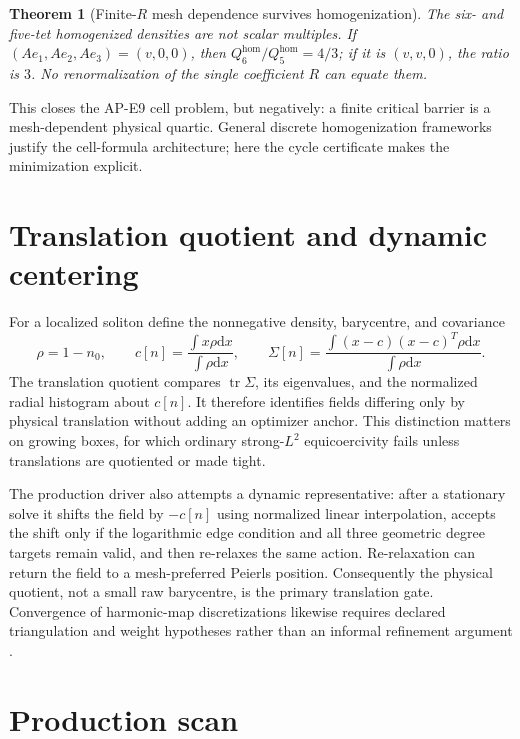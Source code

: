 \documentclass[11pt]{article}
\numberwithin{equation}{section}
\newtheorem{theorem}{Theorem}[section]
\theoremstyle{definition}
\theoremstyle{remark}
\newcommand{\dd}{\mathrm d}
\begin{document}
\begin{theorem}[Finite-$R$ mesh dependence survives homogenization]
The six- and five-tet homogenized densities are not scalar multiples.  If
$(Ae_1,Ae_2,Ae_3)=(v,0,0)$, then
$Q_6^{\mathrm{hom}}/Q_5^{\mathrm{hom}}=4/3$; if it is $(v,v,0)$, the ratio is
$3$.  No renormalization of the single coefficient $R$ can equate them.
\end{theorem}

This closes the AP-E9 cell problem, but negatively: a finite critical barrier
is a mesh-dependent physical quartic.  General discrete homogenization
frameworks \cite{AlicandroBraidesCicaleseSolci2023} justify the cell-formula
architecture; here the cycle certificate makes the minimization explicit.

\section{Translation quotient and dynamic centering}

For a localized soliton define the nonnegative density, barycentre, and
covariance
\begin{equation}
 \rho=1-n_0,\qquad
 c[n]=\frac{\int x\rho\dd x}{\int\rho\dd x},\qquad
 \Sigma[n]=\frac{\int(x-c)(x-c)^T\rho\dd x}{\int\rho\dd x}.
 \label{eq:quotient}
\end{equation}
The translation quotient compares $\operatorname{tr}\Sigma$, its eigenvalues,
and the normalized radial histogram about $c[n]$.  It therefore identifies
fields differing only by physical translation without adding an optimizer
anchor.  This distinction matters on growing boxes, for which ordinary
strong-$L^2$ equicoercivity fails unless translations are quotiented or made
tight.

The production driver also attempts a dynamic representative: after a
stationary solve it shifts the field by $-c[n]$ using normalized linear
interpolation, accepts the shift only if the logarithmic edge condition and
all three geometric degree targets remain valid, and then re-relaxes the
same action.  Re-relaxation can return the field to a mesh-preferred Peierls
position.  Consequently the physical quotient, not a small raw barycentre,
is the primary translation gate.  Convergence of harmonic-map discretizations
likewise requires declared triangulation and weight hypotheses rather than
an informal refinement argument \cite{GasterLoustauMonsaingeon2023}.

\section{Production scan}
\end{document}
